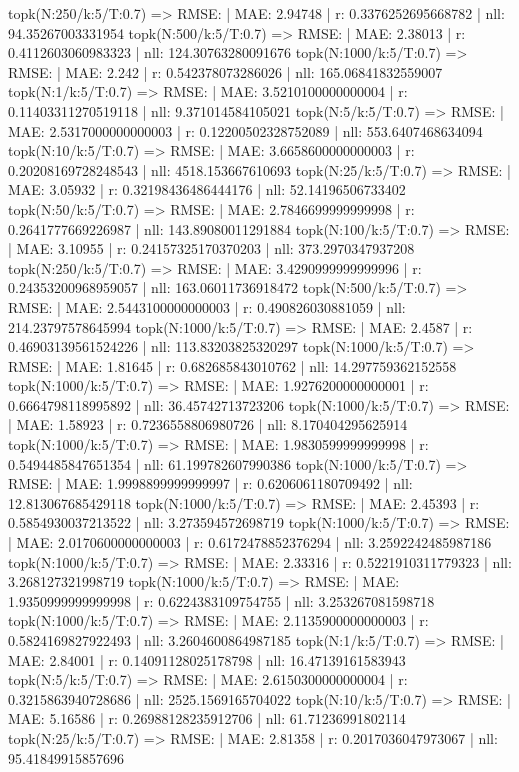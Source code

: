 topk(N:250/k:5/T:0.7) => RMSE: | MAE: 2.94748 | r: 0.3376252695668782 | nll: 94.35267003331954
topk(N:500/k:5/T:0.7) => RMSE: | MAE: 2.38013 | r: 0.4112603060983323 | nll: 124.30763280091676
topk(N:1000/k:5/T:0.7) => RMSE: | MAE: 2.242 | r: 0.542378073286026 | nll: 165.06841832559007
topk(N:1/k:5/T:0.7) => RMSE: | MAE: 3.5210100000000004 | r: 0.11403311270519118 | nll: 9.371014584105021
topk(N:5/k:5/T:0.7) => RMSE: | MAE: 2.5317000000000003 | r: 0.12200502328752089 | nll: 553.6407468634094
topk(N:10/k:5/T:0.7) => RMSE: | MAE: 3.6658600000000003 | r: 0.20208169728248543 | nll: 4518.153667610693
topk(N:25/k:5/T:0.7) => RMSE: | MAE: 3.05932 | r: 0.32198436486444176 | nll: 52.14196506733402
topk(N:50/k:5/T:0.7) => RMSE: | MAE: 2.7846699999999998 | r: 0.2641777669226987 | nll: 143.89080011291884
topk(N:100/k:5/T:0.7) => RMSE: | MAE: 3.10955 | r: 0.24157325170370203 | nll: 373.2970347937208
topk(N:250/k:5/T:0.7) => RMSE: | MAE: 3.4290999999999996 | r: 0.24353200968959057 | nll: 163.06011736918472
topk(N:500/k:5/T:0.7) => RMSE: | MAE: 2.5443100000000003 | r: 0.490826030881059 | nll: 214.23797578645994
topk(N:1000/k:5/T:0.7) => RMSE: | MAE: 2.4587 | r: 0.46903139561524226 | nll: 113.83203825320297
topk(N:1000/k:5/T:0.7) => RMSE: | MAE: 1.81645 | r: 0.682685843010762 | nll: 14.297759362152558
topk(N:1000/k:5/T:0.7) => RMSE: | MAE: 1.9276200000000001 | r: 0.6664798118995892 | nll: 36.45742713723206
topk(N:1000/k:5/T:0.7) => RMSE: | MAE: 1.58923 | r: 0.7236558806980726 | nll: 8.170404295625914
topk(N:1000/k:5/T:0.7) => RMSE: | MAE: 1.9830599999999998 | r: 0.5494485847651354 | nll: 61.199782607990386
topk(N:1000/k:5/T:0.7) => RMSE: | MAE: 1.9998899999999997 | r: 0.6206061180709492 | nll: 12.813067685429118
topk(N:1000/k:5/T:0.7) => RMSE: | MAE: 2.45393 | r: 0.5854930037213522 | nll: 3.273594572698719
topk(N:1000/k:5/T:0.7) => RMSE: | MAE: 2.0170600000000003 | r: 0.6172478852376294 | nll: 3.2592242485987186
topk(N:1000/k:5/T:0.7) => RMSE: | MAE: 2.33316 | r: 0.5221910311779323 | nll: 3.268127321998719
topk(N:1000/k:5/T:0.7) => RMSE: | MAE: 1.9350999999999998 | r: 0.6224383109754755 | nll: 3.253267081598718
topk(N:1000/k:5/T:0.7) => RMSE: | MAE: 2.1135900000000003 | r: 0.5824169827922493 | nll: 3.2604600864987185
topk(N:1/k:5/T:0.7) => RMSE: | MAE: 2.84001 | r: 0.14091128025178798 | nll: 16.47139161583943
topk(N:5/k:5/T:0.7) => RMSE: | MAE: 2.6150300000000004 | r: 0.3215863940728686 | nll: 2525.1569165704022
topk(N:10/k:5/T:0.7) => RMSE: | MAE: 5.16586 | r: 0.26988128235912706 | nll: 61.71236991802114
topk(N:25/k:5/T:0.7) => RMSE: | MAE: 2.81358 | r: 0.2017036047973067 | nll: 95.41849915857696
